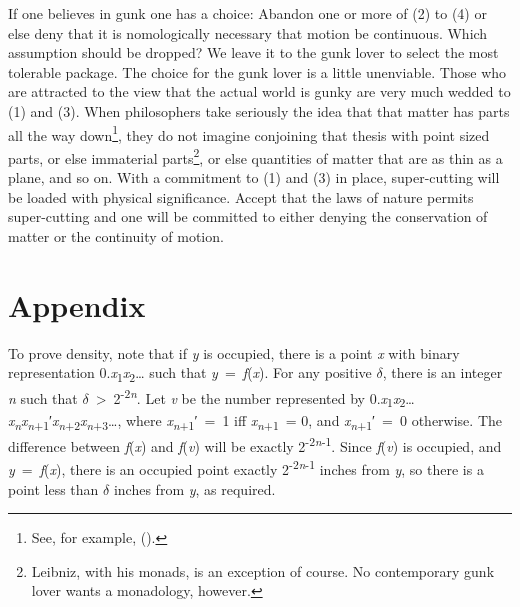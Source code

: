 \documentclass[
  10pt,
  letterpaper,
  DIV=11,
  numbers=noendperiod,
  twoside]{scrartcl}
\begin{document}
If one believes in gunk one has a choice: Abandon one or more of (2) to
(4) or else deny that it is nomologically necessary that motion be
continuous. Which assumption should be dropped? We leave it to the gunk
lover to select the most tolerable package. The choice for the gunk
lover is a little unenviable. Those who are attracted to the view that
the actual world is gunky are very much wedded to (1) and (3). When
philosophers take seriously the idea that that matter has parts all the
way down\footnote{See, for example,
  ().}, they do not imagine
conjoining that thesis with point sized parts, or else immaterial
parts\footnote{Leibniz, with his monads, is an exception of course. No
  contemporary gunk lover wants a monadology, however.}, or else
quantities of matter that are as thin as a plane, and so on. With a
commitment to (1) and (3) in place, super-cutting will be loaded with
physical significance. Accept that the laws of nature permits
super-cutting and one will be committed to either denying the
conservation of matter or the continuity of motion.

\section*{Appendix}\label{appendix}

To prove density, note that if \emph{y} is occupied, there is a point
\emph{x} with binary representation
0.\emph{x}\textsubscript{1}\emph{x}\textsubscript{2}\ldots{} such that
\emph{y}~=~\emph{f}(\emph{x}). For any positive \({\delta}\), there is
an integer \emph{n} such that
\({\delta}\)~\textgreater~2\textsuperscript{-2\emph{n}}. Let \emph{v} be
the number represented by
0.\emph{x}\textsubscript{1}\emph{x}\textsubscript{2}\ldots{}\emph{x\textsubscript{n}x\textsubscript{n}}\textsubscript{+1}′\emph{x\textsubscript{n}}\textsubscript{+2}\emph{x\textsubscript{n}}\textsubscript{+3}\ldots,
where \emph{x\textsubscript{n}}\textsubscript{+1}′~=~1 iff
\emph{x\textsubscript{n}}\textsubscript{+1}~= 0, and
\emph{x\textsubscript{n}}\textsubscript{+1}′~=~0 otherwise. The
difference between \emph{f}(\emph{x}) and \emph{f}(\emph{v}) will be
exactly 2\textsuperscript{-2\emph{n}-1}. Since \emph{f}(\emph{v}) is
occupied, and \emph{y}~=~\emph{f}(\emph{x}), there is an occupied point
exactly 2\textsuperscript{-2\emph{n}-1} inches from \emph{y}, so there
is a point less than \({\delta}\) inches from \emph{y}, as required.
\end{document}
